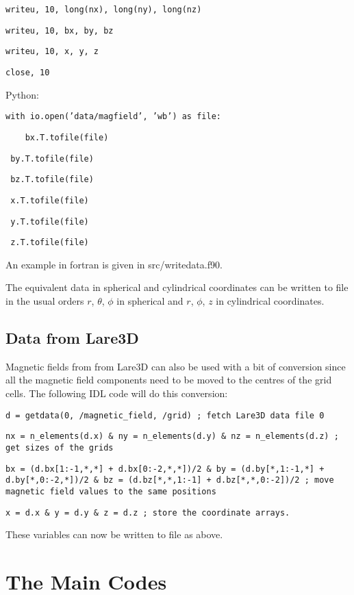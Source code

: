\documentclass[12pt]{article}
\begin{document}
    \texttt{writeu, 10, long(nx), long(ny), long(nz)}

    \texttt{writeu, 10, bx, by, bz}

    \texttt{writeu, 10, x, y, z}

    \texttt{close, 10}

    Python:

    \texttt{with io.open('data/magfield', 'wb') as file:}

    \texttt{\ \ \ \ bx.T.tofile(file)}

    \texttt{    by.T.tofile(file)}
    
    \texttt{    bz.T.tofile(file)}
    
    \texttt{    x.T.tofile(file)}
    
    \texttt{    y.T.tofile(file)}
    
    \texttt{    z.T.tofile(file)}

    An example in fortran is given in src/writedata.f90.

    The equivalent data in spherical and cylindrical coordinates can be written to file in the usual orders \( r \), \( \theta \), \( \phi \) in spherical and \( r \), \( \phi \), \( z \) in cylindrical coordinates.

    \subsection{Data from Lare3D}

      Magnetic fields from from Lare3D can also be used with a bit of conversion since all the magnetic field components need to be moved to the centres of the grid cells. The following IDL code will do this conversion:

      \texttt{d = getdata(0, /magnetic\_field, /grid) ; fetch Lare3D data file 0}

      \texttt{nx = n\_elements(d.x) \& ny = n\_elements(d.y) \& nz = n\_elements(d.z) ; get sizes of the grids}

      \texttt{bx = (d.bx[1:-1,*,*] + d.bx[0:-2,*,*])/2 \& by = (d.by[*,1:-1,*] + d.by[*,0:-2,*])/2 \& bz = (d.bz[*,*,1:-1] + d.bz[*,*,0:-2])/2 ; move magnetic field values to the same positions}

      \texttt{x = d.x \& y = d.y \& z = d.z ; store the coordinate arrays.}

      These variables can now be written to file as above.

  \section{The Main Codes}
\end{document}
